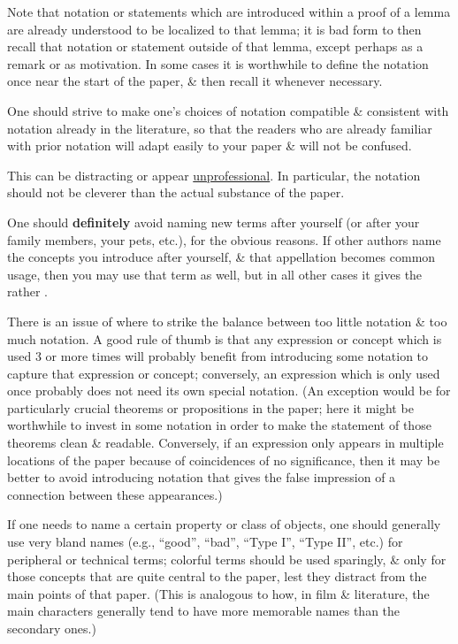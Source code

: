 \documentclass[oneside]{book}
\numberwithin{equation}{section}
\begin{document}
Note that notation or statements which are introduced within a proof of a lemma are already understood to be localized to that lemma; it is bad form to then recall that notation or statement outside of that lemma, except perhaps as a remark or as motivation. In some cases it is worthwhile to define the notation once near the start of the paper, \& then recall it whenever necessary.

One should strive to make one's choices of notation compatible \& consistent with notation already in the literature, so that the readers who are already familiar with prior notation will adapt easily to your paper \& will not be confused.

 This can be distracting or appear \href{https://terrytao.wordpress.com/career-advice/be-professional-in-your-work/}{unprofessional}. In particular, the notation should not be cleverer than the actual substance of the paper.

One should \textbf{definitely} avoid naming new terms after yourself (or after your family members, your pets, etc.), for the obvious reasons. If other authors name the concepts you introduce after yourself, \& that appellation becomes common usage, then you may use that term as well, but in all other cases it gives the rather .

There is an issue of where to strike the balance between too little notation \& too much notation. A good rule of thumb is that any expression or concept which is used 3 or more times will probably benefit from introducing some notation to capture that expression or concept; conversely, an expression which is only used once probably does not need its own special notation. (An exception would be for particularly crucial theorems or propositions in the paper; here it might be worthwhile to invest in some notation in order to make the statement of those theorems clean \& readable. Conversely, if an expression only appears in multiple locations of the paper because of coincidences of no significance, then it may be better to avoid introducing notation that gives the false impression of a connection between these appearances.)

If one needs to name a certain property or class of objects, one should generally use very bland names (e.g., ``good'', ``bad'', ``Type I'', ``Type II'', etc.) for peripheral or technical terms; colorful terms should be used sparingly, \& only for those concepts that are quite central to the paper, lest they distract from the main points of that paper. (This is analogous to how, in film \& literature, the main characters generally tend to have more memorable names than the secondary ones.)
\end{document}
